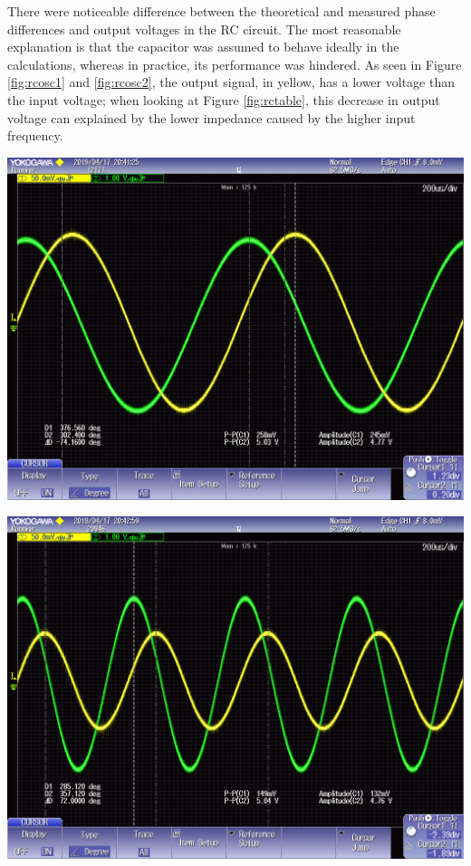 \documentclass[journal]{IEEEtran}
\begin{document}
\noindent There were noticeable difference between the theoretical and measured phase differences and output voltages in the RC circuit. The most reasonable explanation is that the capacitor was assumed to behave ideally in the calculations, whereas in practice, its performance was hindered. As seen in Figure \ref{fig:rcosc1} and \ref{fig:rcosc2}, the output signal, in yellow, has a lower voltage than the input voltage; when looking at Figure \ref{fig:rctable}, this decrease in output voltage can explained by the lower impedance caused by the higher input frequency.


\begingroup
    \centering
    \medskip
    \includegraphics[width=\columnwidth]{images/lab8_002.png}
    \label{fig:rcosc1}
    \medskip
\endgroup

\begingroup
    \centering
    \medskip
    \includegraphics[width=\columnwidth]{images/lab8_005.png}
    \label{fig:rcosc2}
    \medskip
\endgroup
\end{document}
